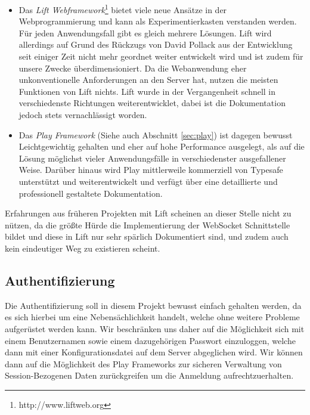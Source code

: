 \begin{itemize}

  \item Das \textit{Lift Webframework}\footnote{http://www.liftweb.org} bietet viele neue Ansätze in
der Webprogrammierung und kann als Experimentierkasten verstanden werden. Für jeden Anwendungsfall
gibt es gleich mehrere Lösungen. Lift wird allerdings auf Grund des Rückzugs von David Pollack aus
der Entwicklung seit einiger Zeit nicht mehr geordnet weiter entwickelt wird und ist zudem für
unsere Zwecke überdimensioniert. Da die Webanwendung eher unkonventionelle Anforderungen an den
Server hat, nutzen die meisten Funktionen von Lift nichts. Lift wurde in der Vergangenheit schnell
in verschiedenste Richtungen weiterentwicklet, dabei ist die Dokumentation jedoch stets
vernachlässigt worden.


  \item Das \textit{Play Framework} (Siehe auch Abschnitt \ref{sec:play}) ist dagegen bewusst
Leichtgewichtig gehalten und eher auf hohe Performance ausgelegt, als auf die Lösung möglichst
vieler Anwendungsfälle in verschiedenster ausgefallener Weise. Darüber hinaus wird Play mittlerweile
kommerziell von Typesafe unterstützt und weiterentwickelt und verfügt über eine detaillierte und
professionell gestaltete Dokumentation. \cite{play}

\end{itemize}

Erfahrungen aus früheren Projekten mit Lift scheinen an dieser Stelle nicht zu nützen, da die größte
Hürde die Implementierung der WebSocket Schnittstelle bildet und diese in Lift nur sehr spärlich
Dokumentiert sind, und zudem auch kein eindeutiger Weg zu existieren scheint.

\subsection{Authentifizierung}

Die Authentifizierung soll in diesem Projekt bewusst einfach gehalten werden, da es sich hierbei um
eine Nebensächlichkeit handelt, welche ohne weitere Probleme aufgerüstet werden kann. Wir
beschränken uns daher auf die Möglichkeit sich mit einem Benutzernamen sowie einem dazugehörigen
Passwort einzuloggen, welche dann mit einer Konfigurationsdatei auf dem Server abgeglichen wird. Wir
können dann auf die Möglichkeit des Play Frameworks zur sicheren Verwaltung von Session-Bezogenen
Daten zurückgreifen um die Anmeldung aufrechtzuerhalten.

